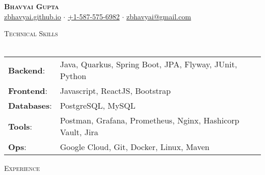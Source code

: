\documentclass[a4paper]{article}
\newcommand{\lineunder} {
    \vspace*{-8pt} \\
    \hspace*{-18pt} \hrulefill \\
}
\newcommand{\header} [1] {
    \vspace*{5pt}
    {\hspace*{-18pt}\vspace*{6pt} \large\textsc{#1}}
    \vspace*{-6pt} \lineunder
}
\begin{document}
\vspace*{-40pt}


\vspace*{-10pt}
\begin{center}
    \textbf{\Huge \scshape {Bhavyai Gupta}}\\
    \href{https://zbhavyai.github.io}{zbhavyai.github.io} $\cdot$ \href{tel:+15875756982}{+1-587-575-6982} $\cdot$ \href{mailto:zbhavyai@gmail.com}{zbhavyai@gmail.com} \\
\end{center}


\header{Technical Skills}

\begin{tabular}{ l l }
    \textbf{Backend}:   & Java, Quarkus, Spring Boot, JPA, Flyway, JUnit, Python                        \\
    \textbf{Frontend}:  & Javascript, ReactJS, Bootstrap                                                \\
    \textbf{Databases}: & PostgreSQL, MySQL                                                             \\
    \textbf{Tools}:     & Postman, Grafana, Prometheus, Nginx, Hashicorp Vault, Jira                    \\
    \textbf{Ops}:       & Google Cloud, Git, Docker, Linux, Maven                                       \\
\end{tabular}
\vspace{2mm}


\header{Experience}
\end{document}
